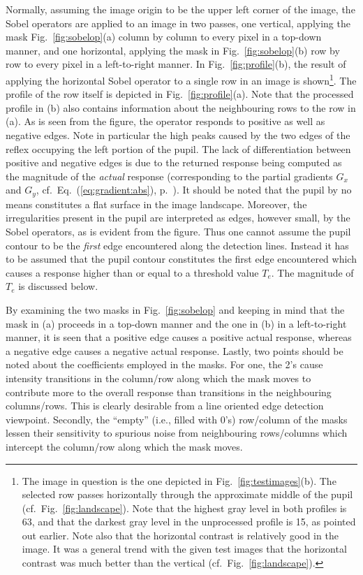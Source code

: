Normally, assuming the image origin to be the upper left corner of the
image, the Sobel operators are applied to an image in two passes, one
vertical, applying the mask Fig.~\ref{fig:sobelop}(a) column by column
to every pixel in a top-down manner, and one horizontal, applying the
mask in Fig.~\ref{fig:sobelop}(b) row by row to every pixel in a
left-to-right manner.  In Fig.~\ref{fig:profile}(b), the result of
applying the horizontal Sobel operator to a single row in an image is
shown\footnote{The image in question is the one depicted in
  Fig.~\ref{fig:testimages}(b).  The selected row passes horizontally
  through the approximate middle of the pupil (cf.\ 
  Fig.~\ref{fig:landscape}).  Note that the highest gray level in both
  profiles is 63, and that the darkest gray level in the unprocessed
  profile is 15, as pointed out earlier.  Note also that the
  horizontal contrast is relatively good in the image.  It was a
  general trend with the given test images that the horizontal
  contrast was much better than the vertical (cf.\ 
  Fig.~\ref{fig:landscape}).}.  The profile of the row itself is
depicted in Fig.~\ref{fig:profile}(a).  Note that the processed
profile in (b) also contains information about the neighbouring rows
to the row in (a).  As is seen from the figure, the operator responds
to positive as well as negative edges.  Note in particular the high
peaks caused by the two edges of the reflex occupying the left portion
of the pupil.  The lack of differentiation between positive and
negative edges is due to the returned response being computed as the
magnitude of the {\em actual\/} response (corresponding to the partial
gradients $G_{x}$ and $G_{y}$, cf.\ Eq.~(\ref{eq:gradient:abs}),
p.~\pageref{eq:gradient:abs}).  It should be noted that the pupil by
no means constitutes a flat surface in the image landscape.  Moreover,
the irregularities present in the pupil are interpreted as edges,
however small, by the Sobel operators, as is evident from the figure.
Thus one cannot assume the pupil contour to be the {\em first\/} edge
encountered along the detection lines.  Instead it has to be assumed
that the pupil contour constitutes the first edge encountered which
causes a response higher than or equal to a threshold value $T_{e}$.
The magnitude of $T_{e}$ is discussed below.

By examining the two masks in Fig.~\ref{fig:sobelop} and keeping in
mind that the mask in (a) proceeds in a top-down manner and the one in
(b) in a left-to-right manner, it is seen that a positive edge causes
a positive actual response, whereas a negative edge causes a negative
actual response.  Lastly, two points should be noted about the
coefficients employed in the masks.  For one, the 2's cause intensity
transitions in the column/row along which the mask moves to contribute
more to the overall response than transitions in the neighbouring
columns/rows.  This is clearly desirable from a line oriented edge
detection viewpoint.  Secondly, the ``empty'' (i.e., filled with 0's)
row/column of the masks lessen their sensitivity to spurious noise
from neighbouring rows/columns which intercept the column/row along
which the mask moves.

